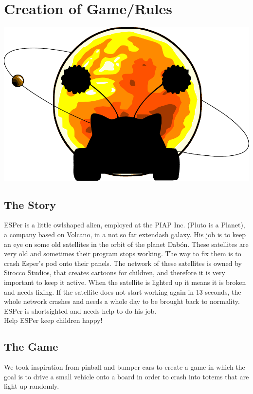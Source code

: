 \documentclass[a4paper,twoside]{book}
\begin{document}
\section{Creation of Game/Rules}

\includegraphics[width=\textwidth]{img/logo_finito}
\subsection{The Story}

ESPer is a little owl\textendash shaped alien, employed at the PIAP Inc. (Pluto is a Planet), a company based on Volcano, in a not so far	extendash galaxy. His job is to keep an eye on some old satellites in the orbit of the planet Dab\'{o}n. These satellites are very old and sometimes their program stops working. The way to fix them is to crash Esper's pod onto their panels. The network of these satellites is owned by Sirocco Studios, that creates cartoons for children, and therefore it is very important to keep it active. When the satellite is lighted up it means it is broken and needs fixing. If the satellite does not start working again in 13 seconds, the whole network crashes and needs a whole day to be brought back to normality. ESPer is short\textendash sighted and needs help to do his job.
\\
Help ESPer keep children happy!

\subsection{The Game}
We took inspiration from pinball and bumper cars to create a game in which the goal is to drive a small vehicle onto a board in order to crash into totems that are light up randomly.
\end{document}
